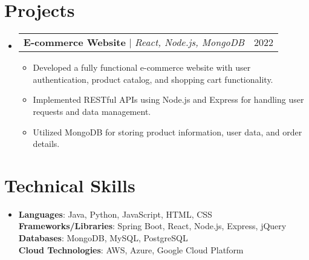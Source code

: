 \documentclass[letterpaper,11pt]{article}
\makeatletter
\newcommand{\resumeItem}[1]{
\item\small{
{#1 \vspace{-2pt}}
}
}
\newcommand{\resumeProjectHeading}[2]{
\item
\begin{tabular*}{0.97\textwidth}{l@{\extracolsep{\fill}}r}
\small#1 & #2 \\
\end{tabular*}\vspace{-7pt}
}
\newcommand{\resumeSubHeadingListStart}{\begin{itemize}[leftmargin=0.15in, label={}]}
\newcommand{\resumeSubHeadingListEnd}{\end{itemize}}
\newcommand{\resumeItemListStart}{\begin{itemize}}
\newcommand{\resumeItemListEnd}{\end{itemize}\vspace{-5pt}}
\makeatother
\begin{document}
\section{Projects}
\resumeSubHeadingListStart
\resumeProjectHeading{\textbf{E-commerce Website} $|$ \emph{React, Node.js, MongoDB}}{2022}
\resumeItemListStart
\resumeItem{Developed a fully functional e-commerce website with user authentication, product catalog, and shopping cart functionality.}
\resumeItem{Implemented RESTful APIs using Node.js and Express for handling user requests and data management.}
\resumeItem{Utilized MongoDB for storing product information, user data, and order details.}
\resumeItemListEnd
\resumeSubHeadingListEnd

\section{Technical Skills} %
\begin{itemize}[leftmargin=0.15in, label={}]
\item{
\textbf{Languages}{: Java, Python, JavaScript, HTML, CSS} \\
\textbf{Frameworks/Libraries}{: Spring Boot, React, Node.js, Express, jQuery} \\
\textbf{Databases}{: MongoDB, MySQL, PostgreSQL} \\
\textbf{Cloud Technologies}{: AWS, Azure, Google Cloud Platform}
} \\
\end{itemize}


\end{document}
